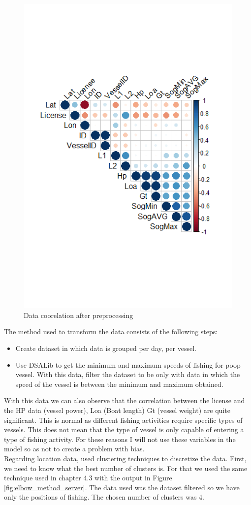 \begin{figure}[h]
    \centering
    \includegraphics[width=0.7\linewidth]{Chapters/img/data_coor2.png}
    \caption{Data coorelation after preprocessing}
    \label{fig:data_coor2}
\end{figure}
\newpage
The method used to transform the data consists of the following steps:
\begin{itemize}
\item	Create dataset in which data is grouped per day, per vessel.
\item	Use DSALib to get the minimum and maximum speeds of fishing for poop vessel. With this data, filter the dataset to be only with data in which the speed of the vessel is between the minimum and maximum obtained.

\end{itemize}

With this data we can also observe that the correlation between the license and the HP data (vessel power), Loa (Boat length) Gt (vessel weight) are quite significant. This is normal as different fishing activities require specific types of vessels. This does not mean that the type of vessel is only capable of entering a type of fishing activity.
For these reasons I will not use these variables in the model so as not to create a problem with bias.
\\
Regarding location data, used clustering techniques to discretize the data.
First, we need to know what the best number of clusters is. For that we used the same technique used in chapter 4.3 with the output in Figure \ref{fig:elbow_method_server}. The data used was the dataset filtered so we have only the positions of fishing. The chosen number of clusters was 4.

